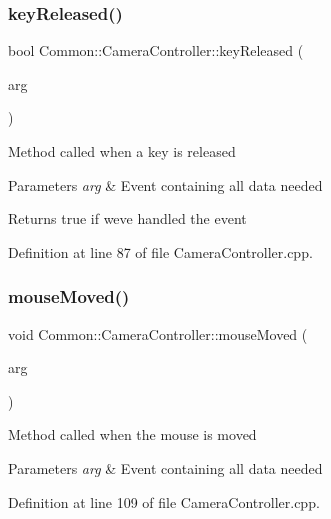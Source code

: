 \subsubsection{\texorpdfstring{key\+Released()}{keyReleased()}}
{\footnotesize\ttfamily bool Common\+::\+Camera\+Controller\+::key\+Released (\begin{DoxyParamCaption}\item[{const \hyperlink{struct_s_d_l___keyboard_event}{S\+D\+L\+\_\+\+Keyboard\+Event} \&}]{arg }\end{DoxyParamCaption})\hspace{0.3cm}{\ttfamily [virtual]}}

Method called when a key is released 
\begin{DoxyParams}{Parameters}
{\em arg} & Event containing all data needed \\
\hline
\end{DoxyParams}
\begin{DoxyReturn}{Returns}
true if we\textquotesingle{}ve handled the event 
\end{DoxyReturn}


Definition at line 87 of file Camera\+Controller.\+cpp.

\mbox{\label{class_common_1_1_camera_controller_af56a45fb24b5c2e5603210be8377aa8d}} 
\subsubsection{\texorpdfstring{mouse\+Moved()}{mouseMoved()}}
{\footnotesize\ttfamily void Common\+::\+Camera\+Controller\+::mouse\+Moved (\begin{DoxyParamCaption}\item[{const \hyperlink{union_s_d_l___event}{S\+D\+L\+\_\+\+Event} \&}]{arg }\end{DoxyParamCaption})\hspace{0.3cm}{\ttfamily [virtual]}}

Method called when the mouse is moved 
\begin{DoxyParams}{Parameters}
{\em arg} & Event containing all data needed \\
\hline
\end{DoxyParams}


Definition at line 109 of file Camera\+Controller.\+cpp.

